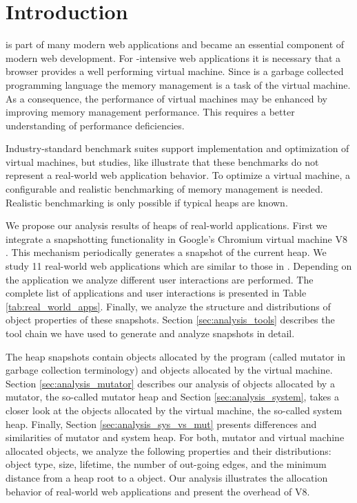 
\section{Introduction}

\JS is part of many modern web applications and became an essential component
of modern web development. For \JS-intensive web applications it is
necessary that a browser provides a well performing \JS virtual machine. Since
\JS is a garbage collected programming language the memory management is a task
of the virtual machine. As a consequence, the performance of \JS virtual
machines may be enhanced by improving memory management performance. This
requires a better understanding of performance deficiencies.

Industry-standard benchmark suites support implementation and optimization of
\JS virtual machines, but studies, like \cite{JSMeter2009} illustrate that
these benchmarks do not represent a real-world web application behavior. To
optimize a \JS virtual machine, a configurable and realistic benchmarking of
memory management is needed. Realistic benchmarking is only possible if typical
\JS heaps are known.

We propose our analysis results of \JS heaps of real-world applications. First
we integrate a snapshotting functionality in Google's Chromium
\cite{Chromium} virtual machine V8 \cite{V8}. This mechanism periodically
generates a snapshot of the current \JS heap. We study 11 real-world web
applications which are similar to those in \cite{JSMeter2009}. Depending on the
application we analyze different user interactions are performed. The complete
list of applications and user interactions is presented in Table
\ref{tab:real_world_apps}. Finally, we analyze the structure and
distributions of object properties of these snapshots. Section
\ref{sec:analysis_tools} describes the tool chain we have used to generate and
analyze snapshots in detail.

The heap snapshots contain objects allocated by the \JS program (called mutator
in garbage collection terminology) and objects allocated by the virtual
machine. Section \ref{sec:analysis_mutator} describes our analysis of objects
allocated by a mutator, the so-called mutator heap and Section
\ref{sec:analysis_system}, takes a closer look at the objects allocated by the
virtual machine, the so-called system heap. Finally, Section
\ref{sec:analysis_sys_vs_mut} presents differences and similarities of mutator
and system heap. For both, mutator and virtual machine allocated objects, we
analyze the following properties and their distributions: object type, size,
lifetime, the number of out-going edges, and the minimum distance from a heap
root to a object. Our analysis illustrates the allocation behavior of
real-world web applications and present the overhead of V8.

